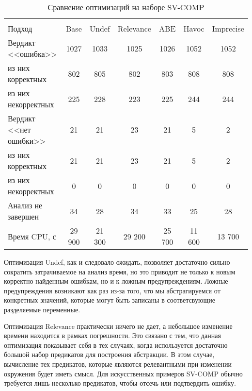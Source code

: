   \begin{table}[h]\footnotesize \centering
    \caption{Сравнение оптимизаций на наборе SV-COMP}
  	\label{table-sv-comp-opt}
    \begin{tabular}{ | l | c | c | c | c | c | c | }
      \hline
      		& 		\multicolumn{6}{c|}{\theory}  \\
      Подход         				& Base 	& Undef 	& Relevance & ABE 	& Havoc 	&  Imprecise \\ \hline
      Вердикт <<ошибка>> 			& 1027  & 1033  	& 1025      & 1026  & 1052     	& 1052       \\ 
  \hspace{0.5cm} из них корректных 	& 802 	& 805 		& 802     	& 803   & 808    	& 808     	\\ 
  \hspace{0.5cm} из них некорректных & 225 	& 228 		& 223     	& 225  	& 244      	& 244       \\ \hline
      Вердикт <<нет ошибки>>  		& 21    & 21    	& 23    	& 21   	& 5     	& 2       \\ 
  \hspace{0.5cm} из них корректных 	& 21 	& 21    	& 23     	& 21   	& 5     	& 2       \\
  \hspace{0.5cm} из них некорректных & 0 	& 0    		& 0     	& 0   	& 0     	& 0       \\ \hline
      Анализ не завершен       		& 34     & 28     	& 34     	& 33   	& 25     	& 28      	\\ \hline
      Время CPU, с   				& 29 900 & 21 300 	& 29 200  	& 25 700 & 11 600   & 13 700     	\\ 
      \hline
    \end{tabular}
  \end{table}

Оптимизация Undef, как и следовало ожидать, позволяет достаточно сильно сократить затрачиваемое на анализ время, но это приводит не только к новым корректно найденным ошибкам, но и к ложным предупреждениям.
Ложные предупреждения возникают как раз из-за того, что мы абстрагируемся от конкретных значений, которые могут быть записаны в соответсвующие разделяемые переменные. 

Оптимизация Relevance практически ничего не дает, а небольшое изменение времени находится в рамках погрешности. 
Это связано с тем, что данная оптимизация показывает себя в тех случаях, когда используется достаточно большой набор предикатов для построения абстракции.
В этом случае, вычисление тех предикатов, которые являются релевантными при изменении окружения будет иметь смысл.
Для искусственных примеров SV-COMP обычно требуется лишь несколько предикатов, чтобы отсечь или подтвердить ошибку.

